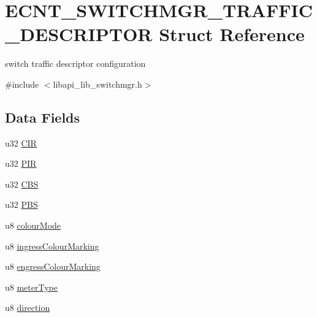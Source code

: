 \hypertarget{structECNT__SWITCHMGR__TRAFFIC__DESCRIPTOR}{}\section{E\+C\+N\+T\+\_\+\+S\+W\+I\+T\+C\+H\+M\+G\+R\+\_\+\+T\+R\+A\+F\+F\+I\+C\+\_\+\+D\+E\+S\+C\+R\+I\+P\+T\+OR Struct Reference}
\label{structECNT__SWITCHMGR__TRAFFIC__DESCRIPTOR}


switch traffic descriptor configuration  




{\ttfamily \#include $<$libapi\+\_\+lib\+\_\+switchmgr.\+h$>$}

\subsection*{Data Fields}
\begin{DoxyCompactItemize}
\item 
u32 \hyperlink{structECNT__SWITCHMGR__TRAFFIC__DESCRIPTOR_aa184a39384972ed5f69a8d495a1e3caf}{C\+IR}
\item 
u32 \hyperlink{structECNT__SWITCHMGR__TRAFFIC__DESCRIPTOR_aa338593a80f08abd497f46dd0d57eec0}{P\+IR}
\item 
u32 \hyperlink{structECNT__SWITCHMGR__TRAFFIC__DESCRIPTOR_a0e361bdbf19e55e78ccba7789b8ff90f}{C\+BS}
\item 
u32 \hyperlink{structECNT__SWITCHMGR__TRAFFIC__DESCRIPTOR_acb9d8a0cf48775d89e6cac7d54568db4}{P\+BS}
\item 
u8 \hyperlink{structECNT__SWITCHMGR__TRAFFIC__DESCRIPTOR_a52370ecbfe2017d124ee359b00f9a7da}{colour\+Mode}
\item 
u8 \hyperlink{structECNT__SWITCHMGR__TRAFFIC__DESCRIPTOR_a1b134215769c30576c7e379638263a8f}{ingress\+Colour\+Marking}
\item 
u8 \hyperlink{structECNT__SWITCHMGR__TRAFFIC__DESCRIPTOR_a971617c3d8b8ef54178634afe7a25396}{engress\+Colour\+Marking}
\item 
u8 \hyperlink{structECNT__SWITCHMGR__TRAFFIC__DESCRIPTOR_adc15907f7a1f6ae298f0340f81e2a42e}{meter\+Type}
\item 
u8 \hyperlink{structECNT__SWITCHMGR__TRAFFIC__DESCRIPTOR_abb7426e923584ad2b1fd97146c8ae0e6}{direction}
\end{DoxyCompactItemize}


